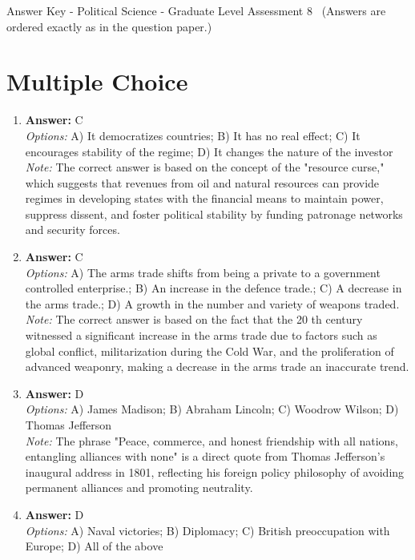 \documentclass[12pt]{article}
\begin{document}
\begin{center}
Answer Key - Political Science - Graduate Level Assessment 8 \
\small (Answers are ordered exactly as in the question paper.)
\end{center}

\section*{Multiple Choice}
\begin{enumerate}[label=\arabic*.]
\item \textbf{Answer:} C
\\ \textit{Options:} A) It democratizes countries; B) It has no real effect; C) It encourages stability of the regime; D) It changes the nature of the investor
\\ \textit{Note:} The correct answer is based on the concept of the "resource curse," which suggests that revenues from oil and natural resources can provide regimes in developing states with the financial means to maintain power, suppress dissent, and foster political stability by funding patronage networks and security forces.
\item \textbf{Answer:} C
\\ \textit{Options:} A) The arms trade shifts from being a private to a government controlled enterprise.; B) An increase in the defence trade.; C) A decrease in the arms trade.; D) A growth in the number and variety of weapons traded.
\\ \textit{Note:} The correct answer is based on the fact that the 20 th century witnessed a significant increase in the arms trade due to factors such as global conflict, militarization during the Cold War, and the proliferation of advanced weaponry, making a decrease in the arms trade an inaccurate trend.
\item \textbf{Answer:} D
\\ \textit{Options:} A) James Madison; B) Abraham Lincoln; C) Woodrow Wilson; D) Thomas Jefferson
\\ \textit{Note:} The phrase "Peace, commerce, and honest friendship with all nations, entangling alliances with none" is a direct quote from Thomas Jefferson's inaugural address in 1801, reflecting his foreign policy philosophy of avoiding permanent alliances and promoting neutrality.
\item \textbf{Answer:} D
\\ \textit{Options:} A) Naval victories; B) Diplomacy; C) British preoccupation with Europe; D) All of the above

\end{enumerate}
\end{document}
